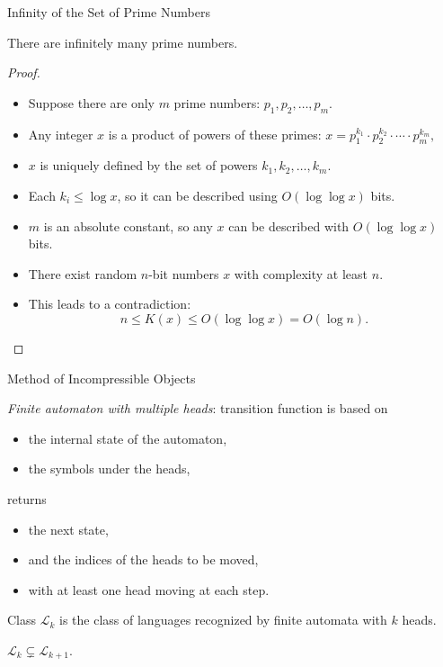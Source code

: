 \documentclass[aspectratio=169]{beamer}
\newcommand{\pitem}{\pause\item}
\newcommand{\seqn}[2]{{#1}_1,{#1}_2,\dotsc,{#1}_{#2}}
\begin{document}
\begin{frame}{Infinity of the Set of Prime Numbers}
\begin{theorem}
    There are infinitely many prime numbers.
\end{theorem}
\begin{proof}
    \begin{itemize}
        \item Suppose there are only $m$ prime numbers: $\seqn{p}{m}$.
        \pitem Any integer $x$ is a product of powers of these primes:
        $
        x = p_1^{k_1}\cdot p_2^{k_2}\cdot\dotsm\cdot p_m^{k_m},
        $
        \pitem $x$ is uniquely defined by the set of powers $\seqn{k}{m}$.

        \pitem Each $k_i \le \log x$, so it can be described using $O(\log \log x)$ bits.

        \pitem $m$ is an absolute constant, so any $x$ can be described with $O(\log \log x)$ bits.

        \pitem There exist random $n$-bit numbers $x$ with complexity at least $n$.

        \pitem
        This leads to a contradiction:
        \[
        n \le K(x) \le O(\log \log x) = O(\log n).
        \]
    \end{itemize}
\end{proof}

\end{frame}


\begin{frame}{Method of Incompressible Objects}
    \begin{definition}
        \emph{Finite automaton with multiple heads}: transition function is based on
        \begin{itemize}
            \item the internal state of the automaton,
            \item the symbols under the heads,
        \end{itemize}
        returns
        \begin{itemize}
            \item the next state,
            \item and the indices of the heads to be moved,
            \item with at least one head moving at each step.
        \end{itemize}
    \end{definition}

    Class $\mathcal{L}_k$ is the class of languages recognized by finite automata with $k$ heads.

    \begin{theorem}\label{thm:kDFA}
        $\mathcal{L}_k \subsetneq \mathcal{L}_{k+1}$.
    \end{theorem}

\end{frame}
\end{document}
